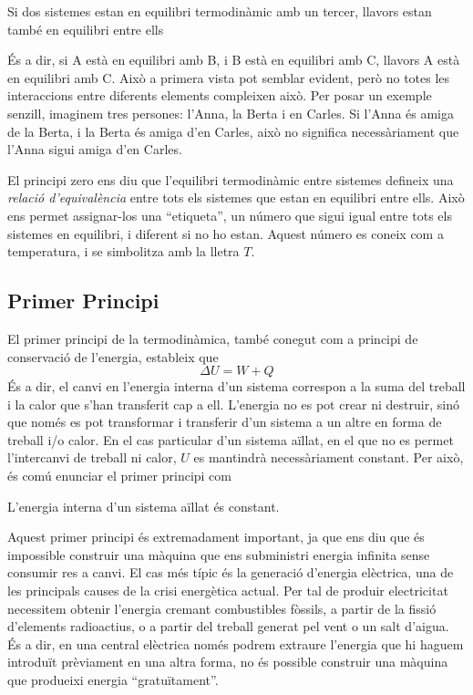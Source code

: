 \documentclass[12pt]{book}
\begin{document}
\begin{mdframed}
\begin{it}
    Si dos sistemes estan en equilibri termodinàmic amb un tercer, llavors estan també en equilibri entre ells
\end{it}
\end{mdframed}

És a dir, si A està en equilibri amb B, i B està en equilibri amb C, llavors A està en equilibri amb C. Això a primera vista pot semblar evident, però no totes les interaccions entre diferents elements compleixen això. Per posar un exemple senzill, imaginem tres persones: l'Anna, la Berta i en Carles. Si l'Anna és amiga de la Berta, i la Berta és amiga d'en Carles, això no significa necessàriament que l'Anna sigui amiga d'en Carles.

El principi zero ens diu que l'equilibri termodinàmic entre sistemes defineix una {\it relació d'equivalència} entre tots els sistemes que estan en equilibri entre ells. Això ens permet assignar-los una ``etiqueta'', un número que sigui igual entre tots els sistemes en equilibri, i diferent si no ho estan. Aquest número es coneix com a temperatura, i se simbolitza amb la lletra $T$.

\subsection{Primer Principi}

El primer principi de la termodinàmica, també conegut com a principi de conservació de l'energia, estableix que
%
\begin{equation}
    \boxed{\Delta U = W + Q}
    \label{eqn:Stokes}
\end{equation}
%
És a dir, el canvi en l'energia interna d'un sistema correspon a la suma del treball i la calor que s'han transferit cap a ell. L'energia no es pot crear ni destruir, sinó que només es pot transformar i transferir d'un sistema a un altre en forma de treball i/o calor. En el cas particular d'un sistema aïllat, en el que no es permet l'intercanvi de treball ni calor, $U$ es mantindrà necessàriament constant. Per això, és comú enunciar el primer principi com

\begin{mdframed}
\begin{it}
    L’energia interna d’un sistema aïllat és constant.
\end{it}
\end{mdframed}

Aquest primer principi és extremadament important, ja que ens diu que és impossible construir una màquina que ens subministri energia infinita sense consumir res a canvi. El cas més típic és la generació d'energia elèctrica, una de les principals causes de la crisi energètica actual. Per tal de produir electricitat necessitem obtenir l'energia cremant combustibles fòssils, a partir de la fissió d'elements radioactius, o a partir del treball generat pel vent o un salt d'aigua. És a dir, en una central elèctrica només podrem extraure l'energia que hi haguem introduït prèviament en una altra forma, no és possible construir una màquina que produeixi energia ``gratuïtament''.
\end{document}
